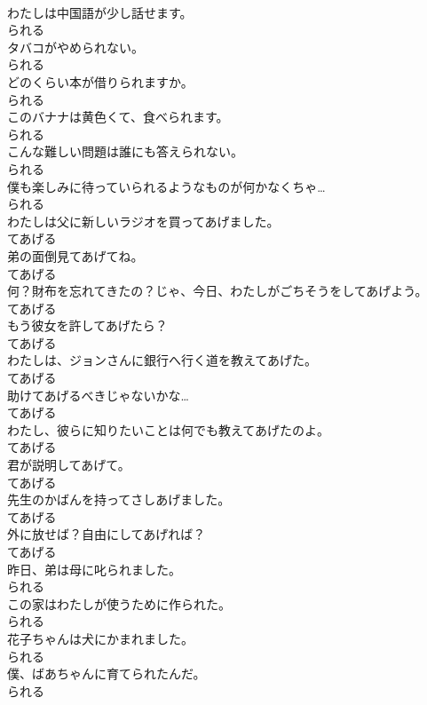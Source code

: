 \documentclass[8pt]{extreport}
\begin{document}
\begin{CJK}{UTF8}{min}
\\	わたしは中国語が少し話せます。	
\\	られる
\\	タバコがやめられない。	
\\	られる
\\	どのくらい本が借りられますか。	
\\	られる
\\	このバナナは黄色くて、食べられます。	
\\	られる
\\	こんな難しい問題は誰にも答えられない。	
\\	られる
\\	僕も楽しみに待っていられるようなものが何かなくちゃ…	
\\	られる
\\	わたしは父に新しいラジオを買ってあげました。	
\\	てあげる
\\	弟の面倒見てあげてね。	
\\	てあげる
\\	何？財布を忘れてきたの？じゃ、今日、わたしがごちそうをしてあげよう。	
\\	てあげる
\\	もう彼女を許してあげたら？	
\\	てあげる
\\	わたしは、ジョンさんに銀行へ行く道を教えてあげた。	
\\	てあげる
\\	助けてあげるべきじゃないかな…	
\\	てあげる
\\	わたし、彼らに知りたいことは何でも教えてあげたのよ。	
\\	てあげる
\\	君が説明してあげて。	
\\	てあげる
\\	先生のかばんを持ってさしあげました。	
\\	てあげる
\\	外に放せば？自由にしてあげれば？	
\\	てあげる
\\	昨日、弟は母に叱られました。	
\\	られる
\\	この家はわたしが使うために作られた。	
\\	られる
\\	花子ちゃんは犬にかまれました。	
\\	られる
\\	僕、ばあちゃんに育てられたんだ。	
\\	られる

\end{CJK}
\end{document}

